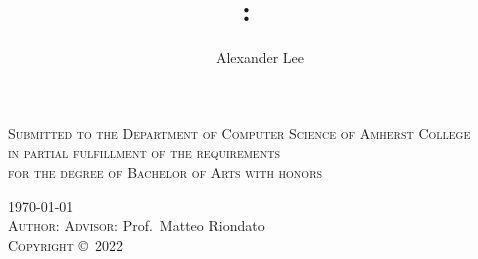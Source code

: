 \documentclass[11pt,twoside,openright]{report}
\author{Alexander Lee}
\title{\algoname: \titlefirstpart\ \titlesecondpart}
\newcommand{\graduationyear}{2022} %
\newcommand{\advisor}{Matteo Riondato} %
\begin{document}

\begin{titlepage}
  \centering
  {\LARGE\makeatletter\textbf{\MakeUppercase\@title}\makeatother}\par
  \vspace{0.6\baselineskip}
  {\scshape Submitted to the Department of Computer Science of Amherst
    College\\[0.5\baselineskip]
    in partial fulfillment of the requirements \\[0.5\baselineskip]
    for the degree of Bachelor of Arts with honors
  }\par
  \vspace{0.6\baselineskip}
  \textsc{\today}\\[1in] %
  \vspace{8\baselineskip}
  {\textsc{Author:} \makeatletter\@author\makeatother%
  \hfill\textsc{Advisor:} Prof.\ \advisor}\\[0.6\baselineskip]
  \vfill
  \textsc{Copyright} \copyright\ \textsc{\graduationyear}\ %
  {\scshape \makeatletter\@author\makeatother}
\end{titlepage}





\tableofcontents %

\doublespacing%








\end{document}
